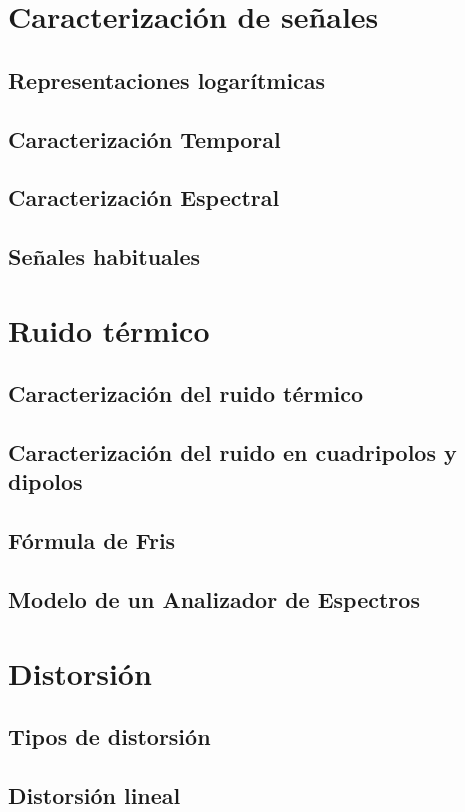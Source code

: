\documentclass[a4paper]{book}
\begin{document}
\chapter{Caracterización de señales}
\section{Representaciones logarítmicas}
\section{Caracterización Temporal}
\section{Caracterización Espectral}
\section{Señales habituales}

\chapter{Ruido térmico}
\section{Caracterización del ruido térmico}
\section{Caracterización del ruido en cuadripolos y dipolos}
\section{Fórmula de Fris}
\section{Modelo de un Analizador de Espectros}

\chapter{Distorsión}
\section{Tipos de distorsión}
\section{Distorsión lineal}
\end{document}
